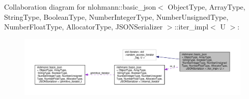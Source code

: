 Collaboration diagram for nlohmann\+:\+:basic\+\_\+json$<$ Object\+Type, Array\+Type, String\+Type, Boolean\+Type, Number\+Integer\+Type, Number\+Unsigned\+Type, Number\+Float\+Type, Allocator\+Type, J\+S\+O\+N\+Serializer $>$\+:\+:iter\+\_\+impl$<$ U $>$\+:\nopagebreak
\begin{figure}[H]
\begin{center}
\leavevmode
\includegraphics[width=350pt]{classnlohmann_1_1basic__json_1_1iter__impl__coll__graph}
\end{center}
\end{figure}
